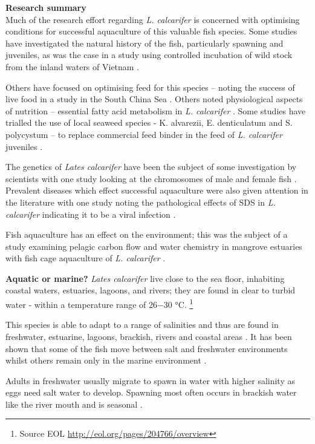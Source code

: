 \documentclass[]{book}
\let\rmarkdownfootnote\footnote%
\def\footnote{\protect\rmarkdownfootnote}
\theoremstyle{definition}
\theoremstyle{definition}
\theoremstyle{definition}
\theoremstyle{remark}
\begin{document}
\textbf{Research summary}\\
Much of the research effort regarding \emph{L. calcarifer} is concerned
with optimising conditions for successful aquaculture of this valuable
fish species. Some studies have investigated the natural history of the
fish, particularly spawning and juveniles, as was the case in a study
using controlled incubation of wild stock from the inland waters of
Vietnam \citep{Shadrin_2015}.

Others have focused on optimising feed for this species -- noting the
success of live food in a study in the South China Sea
\citep{Shansudin_1997}. Others noted physiological aspects of nutrition
-- essential fatty acid metabolism in \emph{L. calcarifer}
\citep{Mohd_Yusof_2010}. Some studies have trialled the use of local
seaweed species - K. alvarezii, E. denticulatum and S. polycystum -- to
replace commercial feed binder in the feed of \emph{L. calcarifer}
juveniles \citep{Shapawi_2015}.

The genetics of \emph{Lates calcarifer} have been the subject of some
investigation by scientists with one study looking at the chromosomes of
male and female fish \citep{Phimphan_2015}. Prevalent diseases which
effect successful aquaculture were also given attention in the
literature with one study noting the pathological effects of SDS in
\emph{L. calcarifer} indicating it to be a viral infection
\citep{Gibson_Kueh_2011}.

Fish aquaculture has an effect on the environment; this was the subject
of a study examining pelagic carbon flow and water chemistry in mangrove
estuaries with fish cage aquaculture of \emph{L. calcarifer}
\citep{Alongi_2003}.

\textbf{Aquatic or marine?} \emph{Lates calcarifer} live close to the
sea floor, inhabiting coastal waters, estuaries, lagoons, and rivers;
they are found in clear to turbid water - within a temperature range of
26−30 °C. \footnote{Source EOL
  \url{http://eol.org/pages/204766/overview}}

This species is able to adapt to a range of salinities and thus are
found in freshwater, estuarine, lagoons, brackish, rivers and coastal
areas \citep{Davis_1986}. It has been shown that some of the fish move
between salt and freshwater environments whilst others remain only in
the marine environment \citep{Davis_1986}.

Adults in freshwater usually migrate to spawn in water with higher
salinity as eggs need salt water to develop. Spawning most often occurs
in brackish water like the river mouth and is seasonal
\citep{Moore_1982}.
\end{document}
